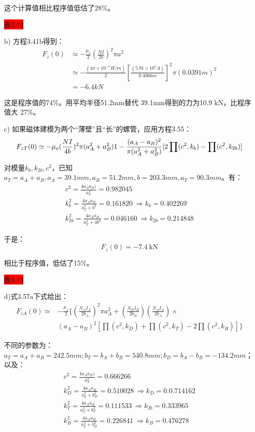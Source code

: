 这个计算值相比程序值低估了28\%。

\colorbox{red}{表3.12}

b) 方程3.41b得到：
\begin{equation}
\begin{split}
F_{z}(0)&\simeq-\frac{\mu_{o}}{2}(\frac{NI}{2b})^{2}\pi a^{2}\\%
&\simeq-\frac{(4\pi\times 10^{-7}H/m)}{2}[\frac{(5.91\times 10^{5}A)}{0.4066m}]^{2}\pi(0.0391m)^{2}\\
&=-6.4kN
\end{split}
\end{equation}

这是程序值的74\%。用平均半径51.2mm替代 39.1mm得到的力为10.9 kN，比程序值大 27\%。 

c) 如果磁体建模为两个“薄壁”且“长”的螺管，应用方程3.55：
\begin{equation}
F_{zT}(0)\simeq-\mu_{o}(\frac{NI}{4b})^{2}\pi(a_{A}^{2}+a_{B}^{2}){1-\frac{(a_{A}-a_{B})^{2}}{\pi(a_{A}^{2}+a_{B}^{2})}[2\prod(c^{2},k_{b})-\prod(c^{2},k_{2b})]}\\%
\end{equation}

对模量$k_b, k_{2b},c^2$，已知$a_T = a_A+a_B, a_A = 39.1 mm, a_B = 51.2 mm, b =203.3 mm, a_T=90.3 mm$。有：
\begin{eqnarray}
c^2=\frac{4a_A a_B)}{a_T^2}=0.982045\\
k_b^2=\frac{4a_A a_B}{a_T^2+b^2}=0.161820\ \Rightarrow k_b=0.402269\\
k_{2b}^2=\frac{4a_A a_B}{a_T^2+4b^2}=0.046160\ \Rightarrow k_{2b}=0.214848
\end{eqnarray}

于是：
$$
F_z(0)=-7.4\ \mathrm{kN}
$$

相比于程序值，低估了15\%。

\colorbox{red}{表3.13}

d)式3.57a下式给出：
\begin{equation}
\begin{split}
F_{zA}(0)\simeq&-\frac{\mu_{o}}{2}\{(\frac{N_{A}I_{A}}{2b_{A}})^{2}\pi a_{A}^{2}+(\frac{N_{B}I_{B}}{2b_{B}})(\frac{N_{A}I_{A}}{2b_{A}})\times\\
&(a_{A}-a_{B})^{2}[\prod(c^{2},k_{D})+\prod(c^{2},k_{T})-2\prod(c^{2},k_{B})]\}%
\end{split}
\end{equation}

不同的参数为：$a_T=a_A+a_B=242.5 mm;b_T=b_A+b_B=540.8 mm; b_D=b_A−b_B=−134.2 mm$；以及：
\begin{eqnarray}
c^2=\frac{4a_A a_B)}{a_T^2}=0.666266\\
k_D^2=\frac{4a_A a_B}{a_T^2+b_D^2}=0.510028\ \Rightarrow k_D=0.0.714162\\
k_{T}^2=\frac{4a_A a_B}{a_T^2+b_T^2}=0.111533\ \Rightarrow k_{2b}=0.333965\\
k_B^2=\frac{4a_A a_B}{a_T^2+b_B^2}=0.226841\ \Rightarrow k_{B}=0.476278
\end{eqnarray}

